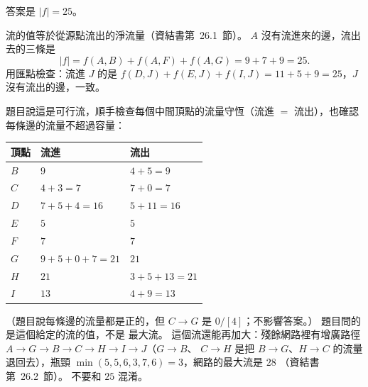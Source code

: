 \begin{pastsoln}
答案是 $|f| = 25$。

流的值等於從源點流出的淨流量（資結書第~26.1~節）。 $A$ 沒有流進來的邊，流出去的三條是
\[
|f| = f(A, B) + f(A, F) + f(A, G) = 9 + 7 + 9 = 25.
\]
用匯點檢查：流進 $J$ 的是 $f(D, J) + f(E, J) + f(I, J) = 11 + 5 + 9 = 25$，$J$ 沒有流出的邊，一致。

題目說這是可行流，順手檢查每個中間頂點的流量守恆（流進 $=$ 流出），也確認每條邊的流量不超過容量：
\begin{center}
\small
\begin{tabular}{lll}
\toprule
頂點 & 流進 & 流出 \\
\midrule
$B$ & $9$ & $4 + 5 = 9$ \\
$C$ & $4 + 3 = 7$ & $7 + 0 = 7$ \\
$D$ & $7 + 5 + 4 = 16$ & $5 + 11 = 16$ \\
$E$ & $5$ & $5$ \\
$F$ & $7$ & $7$ \\
$G$ & $9 + 5 + 0 + 7 = 21$ & $21$ \\
$H$ & $21$ & $3 + 5 + 13 = 21$ \\
$I$ & $13$ & $4 + 9 = 13$ \\
\bottomrule
\end{tabular}
\end{center}
（題目說每條邊的流量都是正的，但 $C \to G$ 是 $0/[4]$；不影響答案。） 題目問的是這個給定的流的值，不是
最大流。 這個流還能再加大：殘餘網路裡有增廣路徑 $A \to G \to B \to C \to H \to I \to J$（$G \to B$、
$C \to H$ 是把 $B \to G$、$H \to C$ 的流量退回去），瓶頸 $\min(5, 5, 6, 3, 7, 6) = 3$，網路的最大流是 $28$
（資結書第~26.2~節）。 不要和 $25$ 混淆。
\end{pastsoln}
